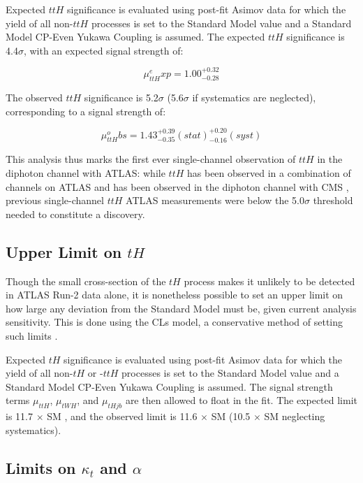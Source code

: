 Expected $ttH$ significance is evaluated using post-fit Asimov data for which the yield of all non-$ttH$ processes is set to the Standard Model value and a Standard Model CP-Even Yukawa Coupling is assumed. The expected $ttH$ significance is 4.4$\sigma$, with an expected signal strength of:
 
\begin{equation}
\mu_{ttH}^exp = 1.00^{+0.32}_{-0.28}
\end{equation}

The observed $ttH$ significance is 5.2$\sigma$ (5.6$\sigma$ if systematics are neglected), corresponding to a signal strength of:

\begin{equation}
\mu_{ttH}^obs = 1.43^{+0.39}_{-0.35}(stat)^{+0.20}_{-0.16}(syst)
\end{equation}
 

This analysis thus marks the first ever single-channel observation of $ttH$ in the diphoton channel with ATLAS: while $ttH$ has been observed in a combination of channels on ATLAS \cite{ttH} and has been observed in the diphoton channel with CMS \cite{ttHCMS}, previous single-channel $ttH$ ATLAS measurements were below the 5.0$\sigma$ threshold needed to constitute a discovery. 
 
\subsection{Upper Limit on $tH$}

Though the small cross-section of the $tH$ process makes it unlikely to be detected in ATLAS Run-2 data alone, it is nonetheless possible to set an upper limit on how large any deviation from the Standard Model must be, given current analysis sensitivity. This is done using the CLs model, a conservative method of setting such limits \cite{CLs}.

Expected $tH$ significance is evaluated using post-fit Asimov data for which the yield of all non-$tH$ or -$ttH$ processes is set to the Standard Model value and a Standard Model CP-Even Yukawa Coupling is assumed. The signal strength terms $\mu_{ttH}$, $\mu_{tWH}$, and $\mu_{tHjb}$ are then allowed to float in the fit. The expected limit is 11.7 $\times$ SM , and the observed limit is 11.6 $\times$ SM (10.5 $\times$ SM neglecting systematics).

\subsection{Limits on $\kappa_{t}$ and $\alpha$}

